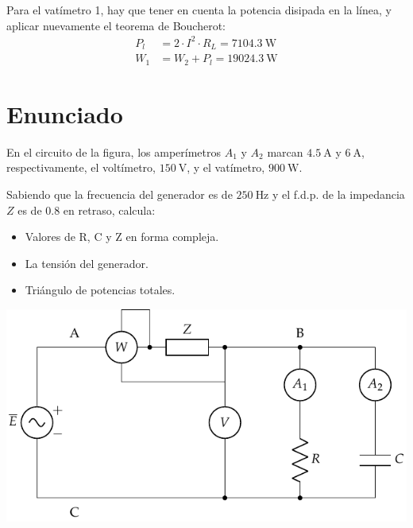 Para el vatímetro 1, hay que tener en cuenta la potencia disipada en la línea, y aplicar nuevamente el teorema de Boucherot:
\begin{align*}
P_l &= 2 \cdot I^2 \cdot R_L = \qty{7104.3}{\watt}\\
W_1 &= W_2 + P_l = \qty{19024.3}{\watt}
\end{align*}



\section{Enunciado}
En el circuito de la figura, los amperímetros $A_1$ y $A_2$ marcan $\qty{4.5}{\ampere}$ y $\qty{6}{\ampere}$, respectivamente, el voltímetro, $\qty{150}{\volt}$, y el
vatímetro, $\qty{900}{\watt}$.

Sabiendo que la frecuencia del generador es de $\qty{250}{\hertz}$ y el f.d.p. de la impedancia $Z$ es de 0.8 en retraso, calcula:

\begin{itemize}
\item Valores de R, C y Z en forma compleja.
\item La tensión del generador.
\item Triángulo de potencias totales.
\end{itemize}

\begin{center}
  \includegraphics[width=0.6\linewidth]{figuras/BT2_09.pdf}
\end{center}


